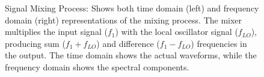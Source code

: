 \begin{figure}[h]
    \caption{Signal Mixing Process: Shows both time domain (left) and frequency domain (right) representations of the mixing process. The mixer multiplies the input signal ($f_1$) with the local oscillator signal ($f_{LO}$), producing sum ($f_1 + f_{LO}$) and difference ($f_1 - f_{LO}$) frequencies in the output. The time domain shows the actual waveforms, while the frequency domain shows the spectral components.}
    \label{fig:mixing-process}
\end{figure}
